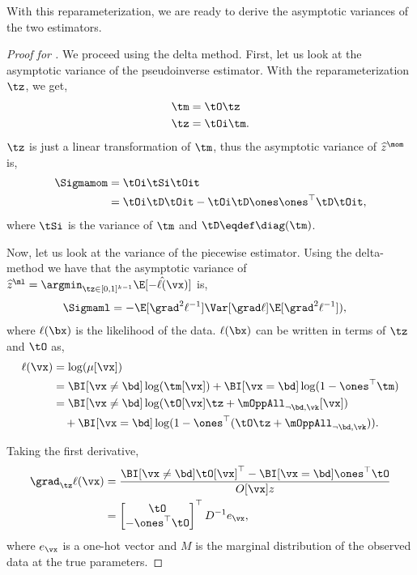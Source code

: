 With this reparameterization, we are ready to derive the asymptotic
variances of the two estimators.

\begin{proof}[Proof for ]
  We proceed using the delta method. First, let us look at the
  asymptotic variance of the pseudoinverse estimator. With the
  reparameterization $\tz$, we get,
  \begin{align*}
    \tm &= \tO \tz \\
    \tz &= \tOi \tm.
  \end{align*}
  $\tz$ is just a linear transformation of $\tm$, thus
  the asymptotic variance of $\widehat{z}^\mom$ is,
  \begin{align*}
      \Sigmamom &= \tOi \tSi \tOit \\
      &= \tOi \tD \tOit - \tOi \tD \ones \ones^\top \tD \tOit,
  \end{align*}
  where $\tSi$ is the variance of $\tm$ and $\tD \eqdef \diag(\tm)$.

  Now, let us look at the variance of the piecewise estimator.  Using
  the delta-method \cite{vaart98asymptotic} we have that the asymptotic
  variance of 
  $\widehat{z}^\ml = \argmin_{\tz \in [0,1]^{k-1}} \hat\E[-\ell(\vx)]$ is,
  \begin{align*}
    \Sigmaml &= -\E[\grad^2 \ell^{-1}] \Var[\grad \ell] \E[\grad^2 \ell^{-1}]),
  \end{align*}
  where $\ell(\bx)$ is the likelihood of the data. $\ell(\bx)$ can be
  written in terms of $\tz$ and $\tO$ as,
  \begin{align*}
    \ell(\vx) 
              &= \log( \mu[\vx] ) \\
              &= \BI[\vx \neq \bd] \log(\tm[\vx]) + \BI[\vx = \bd] \log(1 - \ones^\top \tm ) \\
              &= \BI[\vx \neq \bd] \log(\tO[\vx] \tz + \mOppAll_{\neg \bd, \vk}[\vx]) \\
              &\quad + \BI[\vx = \bd] \log(1 - \ones^\top (\tO \tz + \mOppAll_{\neg \bd, \vk})).
  \end{align*}

Taking the first derivative,
\begin{align}
  \grad_{\tz} \ell(\vx)
  &= 
  \frac{\BI[\vx \neq \bd] \tO[\vx]^\top - \BI[\vx = \bd] \ones^\top \tO}{O[\vx] z} 
  \nonumber \\ 
  &= 
  \begin{bmatrix}
    \tO \\
    -\ones^\top \tO
  \end{bmatrix}^\top
  D^{-1} e_\vx, \label{eqn:lhood-grad}
\end{align}
where $e_\vx$ is a one-hot
vector and $M$ is the marginal distribution of the observed data at
the true parameters.


\end{proof}
